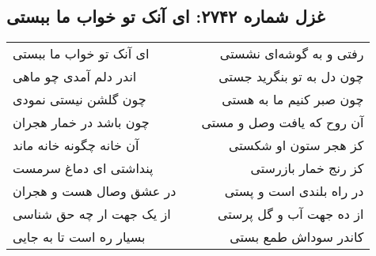 \begin{center}
\section*{غزل شماره ۲۷۴۲: ای آنک تو خواب ما ببستی}
\label{sec:2742}
\begin{longtable}{l p{0.5cm} r}
ای آنک تو خواب ما ببستی
&&
رفتی و به گوشه‌ای نشستی
\\
اندر دلم آمدی چو ماهی
&&
چون دل به تو بنگرید جستی
\\
چون گلشن نیستی نمودی
&&
چون صبر کنیم ما به هستی
\\
چون باشد در خمار هجران
&&
آن روح که یافت وصل و مستی
\\
آن خانه چگونه خانه ماند
&&
کز هجر ستون او شکستی
\\
پنداشتی ای دماغ سرمست
&&
کز رنج خمار بازرستی
\\
در عشق وصال هست و هجران
&&
در راه بلندی است و پستی
\\
از یک جهت ار چه حق شناسی
&&
از ده جهت آب و گل پرستی
\\
بسیار ره است تا به جایی
&&
کاندر سوداش طمع بستی
\\
\end{longtable}
\end{center}
